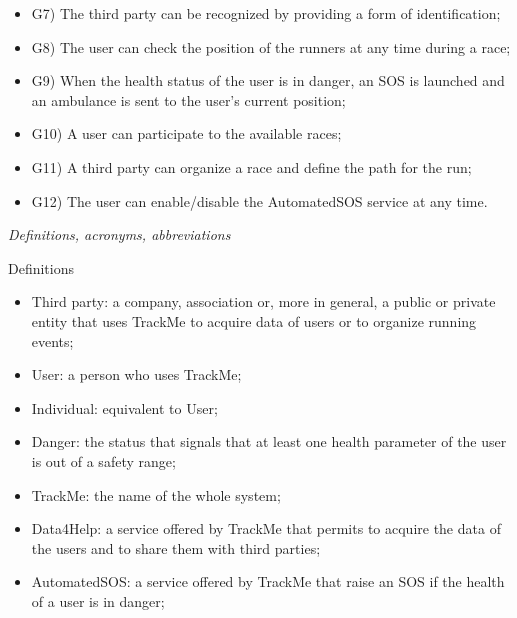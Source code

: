 \documentclass{article}
\begin{document}
\begin{legal}
\begin{legal}
\begin{legal}
{\begin{itemize}
				\item G7) The third party can be recognized by providing a form of identification;\\
				\item G8) The user can check the position of the runners at any time during a race;\\
				\item G9) When the health status of the user is in danger, an SOS is launched and an ambulance is sent to the user’s current position;\\
				\item G10) A user can participate to the available races;\\
				\item G11) A third party can organize a race and define the path for the run;\\
				\item G12) The user can enable/disable the AutomatedSOS service at any time.\\
				\end{itemize}
			}
			\end{legal}
		\item \textit{Definitions, acronyms, abbreviations}\\
			\begin{legal}
			\item Definitions\\
			{\normalfont
				\begin{itemize}
				\item Third party: a company, association or, more in general, a public or private entity that uses TrackMe to acquire data of users or to organize running events;\\
				\item User: a person who uses TrackMe;\\
				\item Individual: equivalent to User;\\
				\item Danger: the status that signals that at least one health parameter of the user is out of a safety range;\\
				\item TrackMe: the name of the whole system;\\
				\item Data4Help: a service offered by TrackMe that permits to acquire the data of the users and to share them with third parties;\\
				\item AutomatedSOS: a service offered by TrackMe that raise an SOS if the health of a user is in danger;\\

\end{itemize}}
\end{legal}
\end{legal}
\end{legal}
\end{document}
